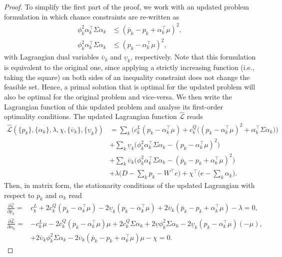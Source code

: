 \documentclass{article}
\begin{document}
\begin{proof}
To simplify the first part of the proof, we work with an updated problem formulation in which chance constraints are re-written as
\begin{align*}
\phi_k^2 \alpha_k^\top \Sigma \alpha_k &\le (\overline{p}_k - p_k + \alpha_k^\top \mu)^2,\\
\phi_k^2 \alpha_k^\top \Sigma \alpha_k &\le (p_k - \alpha_k^\top \mu)^2,
\end{align*}
with Lagrangian dual variables $\overline{\upsilon}_k$ and $\underline{\upsilon}_k$, respectively. Note that this formulation is equivalent to the original one, since applying a strictly increasing function (i.e., taking the square) on both sides of an inequality constraint does not change the feasible set. Hence, a primal solution that is optimal for the updated problem will also be optimal for the original problem and vice-versa. We then write the Lagrangian function of this updated problem and analyse its first-order optimality conditions. The updated Lagrangian function $\hat{\mathcal{L}}$ reads
\begin{align*}
\hat{\mathcal{L}}(\{p_k\}, \{\alpha_k\}, \lambda, \chi, \{\overline{\upsilon}_k\}, \{\underline{\upsilon}_k\}) &= \sum_k \Big(c_k^L(p_k - \alpha_k^\top \mu) + c_k^Q \big((p_k - \alpha_k^\top \mu)^2 + \alpha_k^\top \Sigma \alpha_k\big)\Big)\\
&+ \sum_k \underline{\upsilon}_k \big(\phi_k^2 \alpha_k^\top \Sigma \alpha_k - (p_k - \alpha_k^\top \mu)^2\big)\\
&+ \sum_k \overline{\upsilon}_k \big(\phi_k^2 \alpha_k^\top \Sigma \alpha_k - (\overline{p}_k - p_k + \alpha_k^\top \mu)^2\big)\\
&+ \lambda \Big(D - \sum_k p_k - W^\top e\Big) + \chi^\top \Big(e - \sum_k \alpha_{k}\Big).
\end{align*}
Then, in matrix form, the stationarity conditions of the updated Lagrangian with respect to $p_k$ and $\alpha_k$ read
\begin{align*}
\frac{\partial \hat{\mathcal{L}}}{\partial p_k} =& c_k^L + 2 c_k^Q(p_k - \alpha_k^\top \mu) - 2 \underline{\upsilon}_k(p_k - \alpha_k^\top \mu) + 2 \overline{\upsilon}_k (\overline{p}_k - p_k + \alpha_k^\top \mu) - \lambda = 0,\\
\frac{\partial \hat{\mathcal{L}}}{\partial \alpha_k} =& -c_k^L \mu - 2 c_k^Q (p_k - \alpha_k^\top \mu) \mu + 2 c_k^Q \Sigma \alpha_k + 2 \underline{\upsilon} \phi_k^2 \Sigma \alpha_k - 2 \underline{\upsilon}_k (p_k - \alpha_k^\top \mu)(-\mu),\\
&+ 2 \overline{\upsilon}_k \phi_k^2 \Sigma \alpha_k - 2 \overline{\upsilon}_k (\overline{p}_k - p_k + \alpha_k^\top \mu) \mu - \chi = 0.

\end{align*}
\end{proof}
\end{document}
